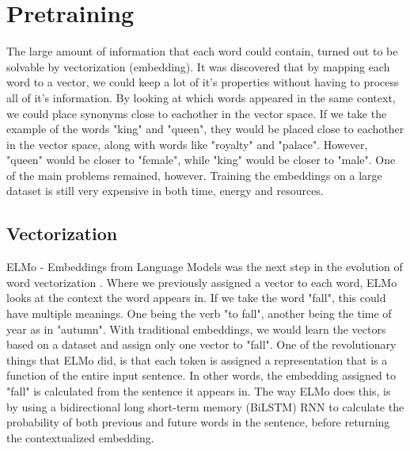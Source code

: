 \documentclass{report}
\begin{document}
\section{Pretraining}
\noindent
The large amount of information that each word could contain, turned out to be solvable by vectorization (embedding). It was discovered that by mapping each word to a vector, we could keep a lot of it's properties without having to process all of it's information. By looking at which words appeared in the same context, we could place synonyms close to eachother in the vector space. If we take the example of the words "king" and "queen", they would be placed close to eachother in the vector space, along with words like "royalty" and "palace". However, "queen" would be closer to "female", while "king" would be closer to "male". One of the main problems remained, however. Training the embeddings on a large dataset is still very expensive in both time, energy and resources.
\noindent
\subsection{Vectorization}
ELMo - Embeddings from Language Models was the next step in the evolution of word vectorization \cite{Peters:2018}. Where we previously assigned a vector to each word, ELMo looks at the context the word appears in. If we take the word "fall", this could have multiple meanings. One being the verb "to fall", another being the time of year as in "autumn". With traditional embeddings, we would learn the vectors based on a dataset and assign only one vector to "fall". One of the revolutionary things that ELMo did, is that each token is assigned a representation that is a function of the entire input sentence. In other words, the embedding assigned to "fall" is calculated from the sentence it appears in. The way ELMo does this, is by using a bidirectional long short-term memory (BiLSTM) RNN to calculate the probability of both previous and future words in the sentence, before returning the contextualized embedding.
\end{document}
